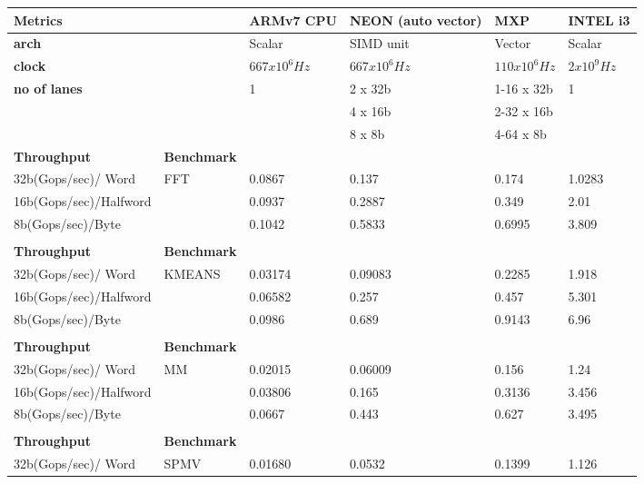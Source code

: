\begin{table}[htbp]
	\centering
    	\begin{adjustbox}{width=.8\textwidth}
    	\small
	\begin{tabular}{llllll}
		\toprule
		\textbf{Metrics} &   & \textbf{ARMv7 CPU} & \textbf{NEON (auto vector)} & \textbf{MXP} & \textbf{INTEL i3} \\
		\midrule
		\textbf{arch} &   & Scalar & SIMD unit & Vector & Scalar \\
		\textbf{clock} &   & $667 x 10^{6}Hz$ & $667 x 10^{6}Hz$ & $110 x 10^{6}Hz$ & $2 x 10^{9}Hz$ \\
		\textbf{no of lanes} &   & 1 & 2 x 32b & 1-16 x 32b & 1 \\
		&   &   & 4 x 16b & 2-32 x 16b &  \\
		&   &   & 8 x 8b & 4-64 x 8b &  \\
		\midrule
		  \textbf{Throughput} & \textbf{Benchmark} &   &   &   &  \\
		\midrule
		  32b(Gops/sec)/ Word   & FFT & 0.0867 & 0.137 & 0.174 & 1.0283 \\
		  16b(Gops/sec)/Halfword &   & 0.0937 & 0.2887 & 0.349 & 2.01 \\
		  8b(Gops/sec)/Byte &   & 0.1042 & 0.5833 & 0.6995 & 3.809 \\
		    &   &   &   &   &  \\
		\midrule
		  \textbf{Throughput} & \textbf{Benchmark} &   &   &   &  \\
		\midrule
		  32b(Gops/sec)/ Word   & KMEANS & 0.03174 & 0.09083 & 0.2285 & 1.918 \\
		  16b(Gops/sec)/Halfword &   & 0.06582 & 0.257 & 0.457 & 5.301 \\
		  8b(Gops/sec)/Byte &   & 0.0986 & 0.689 & 0.9143 & 6.96 \\
		    &   &   &   &   &  \\
		\midrule
		  \textbf{Throughput} & \textbf{Benchmark} &   &   &   &  \\
		\midrule
		  32b(Gops/sec)/ Word   & MM & 0.02015 & 0.06009 & 0.156 & 1.24 \\
		  16b(Gops/sec)/Halfword &   & 0.03806 & 0.165 & 0.3136 & 3.456 \\
		  8b(Gops/sec)/Byte &   & 0.0667 & 0.443 & 0.627 & 3.495 \\
		    &   &   &   &   &  \\
		\midrule
		  \textbf{Throughput} & \textbf{Benchmark} &   &   &   &  \\
		\midrule
		  32b(Gops/sec)/ Word   & SPMV & 0.01680 & 0.0532 & 0.1399 & 1.126 \\

\end{tabular}
\end{adjustbox}
\end{table}
